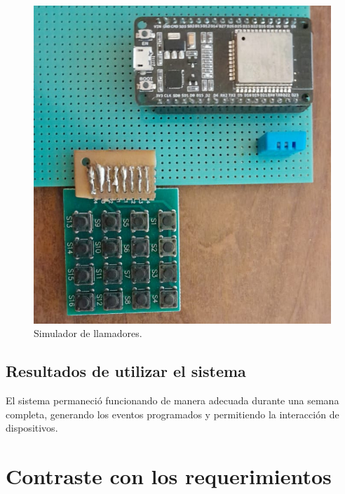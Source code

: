 \begin{figure}[ht]
	\centering
	\includegraphics[scale=.35]{./Figures/simulador.png}
	\caption{Simulador de llamadores.}
	\label{fig:Simulador de llamadores}
\end{figure}

\subsection{Resultados de utilizar el sistema}
\label{Resultados de utilizar el sistema}
El sistema permaneció funcionando de manera adecuada durante una semana completa, generando los eventos programados y permitiendo la interacción de dispositivos.

\pagebreak
\section{Contraste con los requerimientos}
\label{Contraste con los requerimientos}


